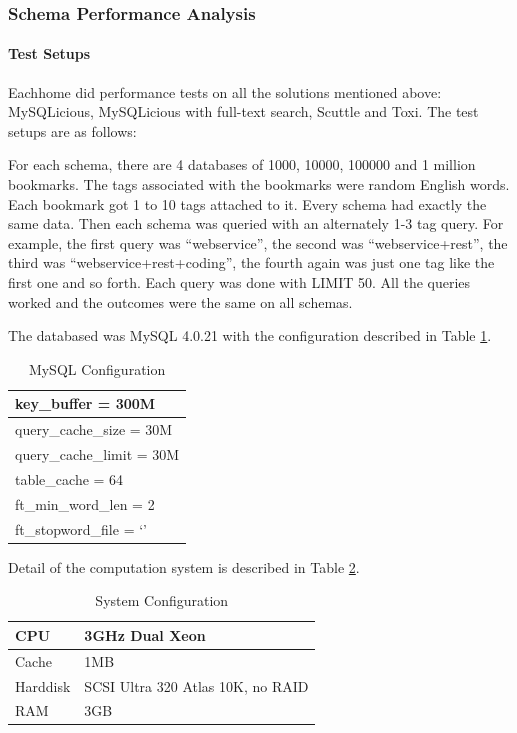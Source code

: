 \subsubsection{Schema Performance Analysis}
\paragraph{Test Setups}
Eachhome \cite{puiperformance} did performance tests on all the solutions mentioned above: MySQLicious, MySQLicious with full-text search, Scuttle and Toxi. The test setups are as follows:

For each schema, there are 4 databases of 1000, 10000, 100000 and 1 million bookmarks. The tags associated with the bookmarks were random English words. Each bookmark got 1 to 10 tags attached to it. Every schema had exactly the same data. Then each schema was queried with an alternately 1-3 tag query. For example, the first query was ``webservice'', the second was ``webservice+rest'', the third was ``webservice+rest+coding'', the fourth again was just one tag like the first one and so forth. 
Each query was done with LIMIT 50. All the queries worked and the outcomes were the same on all schemas.

The databased was MySQL 4.0.21 with the configuration described in Table \ref{tb:mysqlconfig}.

\begin{table}[!ht]
\centering
\caption{MySQL Configuration}\label{tb:mysqlconfig}
\begin{tabular}{| l |} \hline
key\_buffer = 300M \\ \hline
query\_cache\_size = 30M \\ \hline
query\_cache\_limit = 30M \\ \hline
table\_cache = 64 \\ \hline
ft\_min\_word\_len = 2 \\ \hline
ft\_stopword\_file = `' \\ \hline
\end{tabular}
\end{table}

Detail of the computation system is described in Table \ref{tb:systemconf}.

\begin{table}[!ht]
\centering
\caption{System Configuration}\label{tb:systemconf}
\begin{tabular}{| l | l |} \hline
CPU & 3GHz Dual Xeon\\ \hline
Cache & 1MB\\ \hline
Harddisk & SCSI Ultra 320 Atlas 10K, no RAID\\ \hline
RAM & 3GB\\ \hline
\end{tabular}
\end{table}

